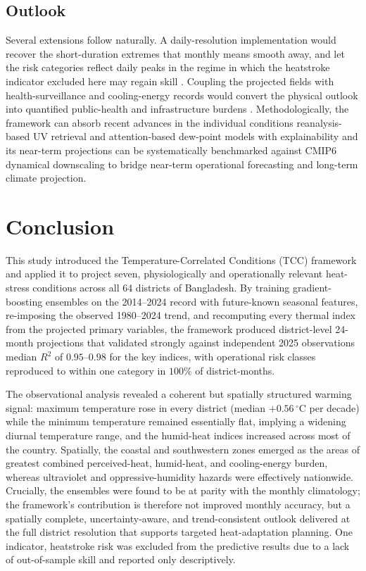 \documentclass[review,11pt]{elsarticle}
\newcommand{\degC}{\ensuremath{^{\circ}\mathrm{C}}}
\begin{document}
\subsection{Outlook}
Several extensions follow naturally. A daily-resolution implementation would
recover the short-duration extremes that monthly means smooth away, and let the risk
categories reflect daily peaks in the regime in which the heatstroke indicator
excluded here may regain skill \citep{ehsan2026extremeheat}. Coupling the projected
fields with health-surveillance and cooling-energy records would convert the
physical outlook into quantified public-health and infrastructure burdens
\citep{miah2026}. Methodologically, the framework can absorb recent advances in the
individual conditions reanalysis-based UV retrieval \citep{teggi2026uvindex} and
attention-based dew-point models with explainability \citep{abdullah2025xai} and
its near-term projections can be systematically benchmarked against CMIP6 dynamical
downscaling \citep{khatun2024} to bridge near-term operational forecasting and
long-term climate projection.

\section{Conclusion}\label{sec:conclusion}
This study introduced the Temperature-Correlated Conditions (TCC) framework and
applied it to project seven, physiologically and operationally relevant heat-stress
conditions across all 64 districts of Bangladesh. By training gradient-boosting
ensembles on the 2014--2024 record with future-known seasonal features,
re-imposing the observed 1980--2024 trend, and recomputing every thermal index
from the projected primary variables, the framework produced district-level
24-month projections that validated strongly against independent 2025
observations median $R^{2}$ of $0.95$--$0.98$ for the key indices, with
operational risk classes reproduced to within one category in $100\%$ of
district-months.

The observational analysis revealed a coherent but spatially structured warming
signal: maximum temperature rose in every district (median $+0.56\,\degC$ per
decade) while the minimum temperature remained essentially flat, implying a widening
diurnal temperature range, and the humid-heat indices increased across most of the
country. Spatially, the coastal and southwestern zones emerged as the areas of
greatest combined perceived-heat, humid-heat, and cooling-energy burden, whereas
ultraviolet and oppressive-humidity hazards were effectively nationwide. Crucially,
the ensembles were found to be at parity with the monthly climatology; the framework's
contribution is therefore not improved monthly accuracy, but a spatially complete,
uncertainty-aware, and trend-consistent outlook delivered at the full district
resolution that supports targeted heat-adaptation planning. One indicator,
heatstroke risk was excluded from the predictive results due to a lack of
out-of-sample skill and reported only descriptively.
\end{document}
